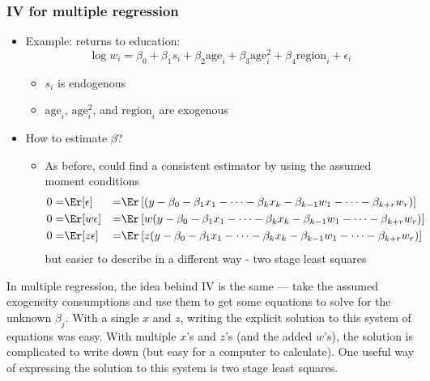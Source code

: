 \begin{frame}[allowframebreaks]\frametitle{IV for multiple regression}
  \begin{itemize}
  \item Example: returns to education:
    \[ \log w_i = \beta_0 + \beta_1 s_i + \beta_2 \mathrm{age}_i +
    \beta_3 \mathrm{age}_i^2 + \beta_4 \mathrm{region}_i +
    \epsilon_i \]
    \begin{itemize}
    \item $s_i$ is endogenous
    \item $\mathrm{age}_i$, $\mathrm{age}_i^2$, and
      $\mathrm{region}_i$ are exogenous
    \end{itemize}
  \item How to estimate $\beta$?
    \pause
    \begin{itemize}
    \item As before, could find a consistent estimator by using the
      assumed moment conditions
      {\scriptsize{
          \hspace*{-10cm}  
          \begin{align*}
            0 = & \Er[\epsilon] &= &\Er\left[ ( y - \beta_0 - \beta_1 x_{1} - \cdots - \beta_k x_{k} -
              \beta_{k-1} w_{1} - \cdots - \beta_{k+r} w_{r} ) \right] \\
            0 = & \Er[w\epsilon] &=& \Er\left[w( y - \beta_0 - \beta_1 x_{1} - \cdots - \beta_k x_{k} -
              \beta_{k-1} w_{1} - \cdots - \beta_{k+r} w_{r} ) \right] \\
            0 = & \Er[z\epsilon] &= &\Er\left[z( y - \beta_0 - \beta_1 x_{1} - \cdots - \beta_k x_{k} -
              \beta_{k-1} w_{1} - \cdots - \beta_{k+r} w_{r} ) \right] 
          \end{align*}
        }}
      but easier to describe in a different way - two stage least squares
    \end{itemize}
  \end{itemize}
\end{frame}

In multiple regression, the idea behind IV is the same --- take the
assumed exogeneity consumptions and use them to get some equations to
solve for the unknown $\beta_j$. With a single $x$ and $z$, writing
the explicit solution to this system of equations was easy. With
multiple $x$'s and $z$'s (and the added $w$'s), the solution is
complicated to write down (but easy for a computer to calculate). 
One useful way of expressing the solution to this system is two stage
least squares.


